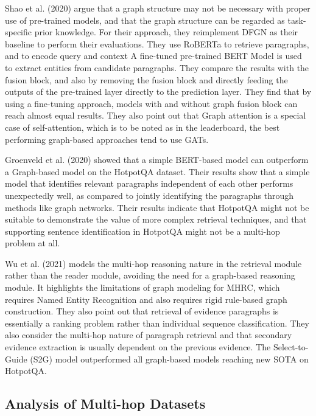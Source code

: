 \documentclass[sigplan,screen]{acmart}
\begin{document}
Shao et al. (2020) \cite{RN127} argue that a graph structure may not be necessary with proper use of pre-trained models, and that the graph 
structure can be regarded as task-specific prior knowledge. For their approach, they reimplement DFGN \cite{RN122} as their baseline to perform 
their evaluations. They use RoBERTa \cite{RN171} to retrieve paragraphs, and to encode query and context A fine-tuned pre-trained BERT Model 
is used to extract entities from candidate paragraphs. They compare the results with the fusion block, and also by removing the fusion block 
and directly feeding the outputs of the pre-trained layer directly to the prediction layer. They find that by using a fine-tuning approach, 
models with and without graph fusion block can reach almost equal results. They also point out that Graph 
attention is a special case of self-attention, which is to be noted as in the leaderboard, the best performing graph-based approaches tend 
to use GATs.

Groenveld et al. (2020) \cite{RN126} showed that a simple BERT-based model can outperform a Graph-based model on the HotpotQA dataset.
Their results show that a simple model that identifies relevant paragraphs independent of each other performs unexpectedly well, as compared to 
jointly identifying the paragraphs through methods like graph networks. Their results indicate that HotpotQA might not be suitable to 
demonstrate the value of more complex retrieval techniques, and that supporting sentence identification in HotpotQA might not be a multi-hop 
problem at all.

Wu et al. (2021) \cite{RN106} models the multi-hop reasoning nature in the retrieval module rather than the reader module, avoiding the need 
for a graph-based reasoning module. It highlights the limitations of graph modeling for MHRC, which requires Named Entity Recognition and 
also requires rigid rule-based graph construction. They also point out that retrieval of evidence paragraphs is essentially a ranking problem 
rather than individual sequence classification. They also consider the multi-hop nature of paragraph retrieval and that secondary evidence 
extraction is usually dependent on the previous evidence. The Select-to-Guide (S2G) model outperformed all graph-based models reaching new 
SOTA on HotpotQA.



\subsection{Analysis of Multi-hop Datasets}
\end{document}
